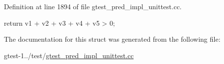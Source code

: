 \-Definition at line 1894 of file gtest\-\_\-pred\-\_\-impl\-\_\-unittest.\-cc.


\begin{DoxyCode}
                                {
    return v1 + v2 + v3 + v4 + v5 > 0;
  }
\end{DoxyCode}


\-The documentation for this struct was generated from the following file\-:\begin{DoxyCompactItemize}
\item 
gtest-\/1../test/\hyperlink{gtest__pred__impl__unittest_8cc}{gtest\-\_\-pred\-\_\-impl\-\_\-unittest.\-cc}\end{DoxyCompactItemize}
